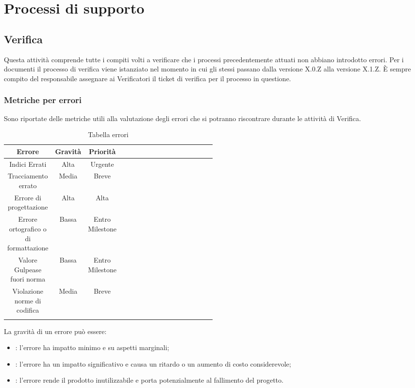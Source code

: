 \section{Processi di supporto}

\subsection{Verifica}
Questa attività comprende tutte i compiti volti a verificare che i processi precedentemente attuati non abbiano introdotto errori.
Per i documenti il processo di verifica viene istanziato nel momento in cui gli stessi passano dalla versione X.0.Z alla versione X.1.Z. 
È sempre compito del responsabile assegnare ai Verificatori il ticket di verifica per il processo in questione.

\subsubsection{Metriche per errori}
Sono riportate delle metriche utili alla valutazione degli errori che si potranno riscontrare durante le attività di Verifica.
\begin{center}
\begin{longtable}{|c|c|c|p{0.5\linewidth}|}
\toprule
\textbf{Errore} & \textbf{Gravità} & \textbf{Priorità} \\

\midrule
Indici Errati & Alta & Urgente\\
\midrule
Tracciamento errato & Media & Breve\\
\midrule
Errore di progettazione & Alta & Alta\\
\midrule
Errore ortografico o di formattazione & Bassa & Entro Milestone\\
\midrule
Valore Gulpease fuori norma & Bassa & Entro Milestone\\
\midrule
Violazione norme di codifica & Media & Breve\\

\bottomrule
\caption{Tabella errori}
\label{tab:changelog}
\end{longtable}
\end{center}

La gravità di un errore può essere:

\begin{itemize}
\item {}: l'errore ha impatto minimo e su aspetti marginali;
\item {}: l'errore ha un impatto significativo e causa un ritardo o un aumento di costo considerevole;
\item {}: l'errore rende il prodotto inutilizzabile e porta potenzialmente al fallimento del progetto.
\end{itemize}

